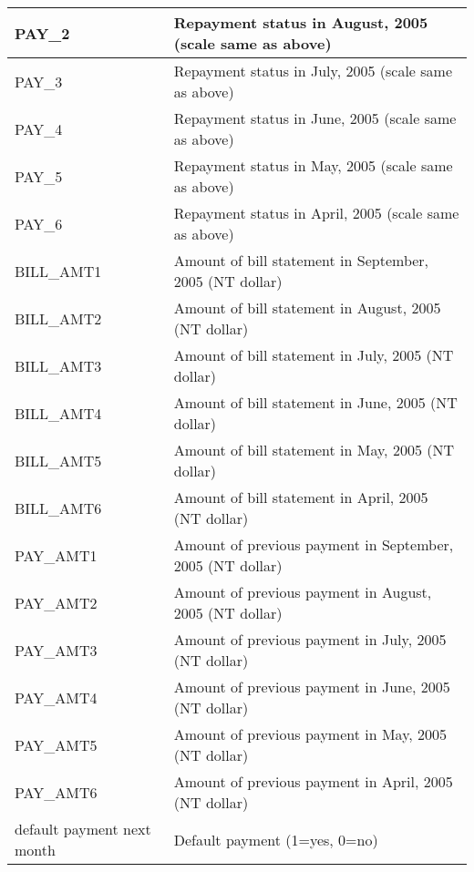 \begin{table}[]
{\begin{tabular}{|l|l|}
PAY\_2                     &        
Repayment status in August, 2005 (scale same as above)\\ \hline
PAY\_3                     &          Repayment status in July, 2005 (scale same as above)            \\ \hline
PAY\_4                     &            Repayment status in June, 2005 (scale same as above)          \\ \hline
PAY\_5                     &            Repayment status in May, 2005 (scale same as above)          \\ \hline
PAY\_6                     &           Repayment status in April, 2005 (scale same as above)           \\ \hline
BILL\_AMT1                 &           Amount of bill statement in September, 2005 (NT dollar)           \\ \hline
BILL\_AMT2                 &            Amount of bill statement in August, 2005 (NT dollar)          \\ \hline
BILL\_AMT3                 &              Amount of bill statement in July, 2005 (NT dollar)        \\ \hline
BILL\_AMT4                 &            Amount of bill statement in June, 2005 (NT dollar)          \\ \hline
BILL\_AMT5                 &           Amount of bill statement in May, 2005 (NT dollar)           \\ \hline
BILL\_AMT6                 &           Amount of bill statement in April, 2005 (NT dollar)           \\ \hline
PAY\_AMT1                  &               Amount of previous payment in September, 2005 (NT dollar)       \\ \hline
PAY\_AMT2                  &          Amount of previous payment in August, 2005 (NT dollar)            \\ \hline
PAY\_AMT3                  &              Amount of previous payment in July, 2005 (NT dollar)        \\ \hline
PAY\_AMT4                  &              Amount of previous payment in June, 2005 (NT dollar)        \\ \hline
PAY\_AMT5                  &              Amount of previous payment in May, 2005 (NT dollar)        \\ \hline
PAY\_AMT6                  &           Amount of previous payment in April, 2005 (NT dollar)           \\ \hline
default payment next month &             Default payment (1=yes, 0=no)         \\ \hline
\end{tabular}}
\end{table}
